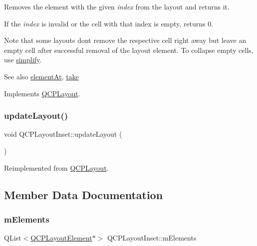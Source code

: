 Removes the element with the given {\itshape index} from the layout and returns it.

If the {\itshape index} is invalid or the cell with that index is empty, returns 0.

Note that some layouts don\textquotesingle{}t remove the respective cell right away but leave an empty cell after successful removal of the layout element. To collapse empty cells, use \mbox{\hyperlink{class_q_c_p_layout_inset_a18b7d508f0baa60cc5dcb1343cf7f32a}{simplify}}.

\begin{DoxySeeAlso}{See also}
\mbox{\hyperlink{class_q_c_p_layout_inset_a881ca205605bae9c034733b808f93a02}{element\+At}}, \mbox{\hyperlink{class_q_c_p_layout_inset_af7f13cc369f8190b5e7e17d5f39dfe1c}{take}} 
\end{DoxySeeAlso}


Implements \mbox{\hyperlink{class_q_c_p_layout_a5a79621fa0a6eabb8b520cfc04fb601a}{Q\+C\+P\+Layout}}.

\mbox{\label{class_q_c_p_layout_inset_a493526b922ea66a75c45ef1842446988}} 
\subsubsection{\texorpdfstring{updateLayout()}{updateLayout()}}
{\footnotesize\ttfamily void Q\+C\+P\+Layout\+Inset\+::update\+Layout (\begin{DoxyParamCaption}{ }\end{DoxyParamCaption})\hspace{0.3cm}{\ttfamily [virtual]}}



Reimplemented from \mbox{\hyperlink{class_q_c_p_layout_a165c77f6287ac92e8d03017ad913378b}{Q\+C\+P\+Layout}}.



\subsection{Member Data Documentation}
\mbox{\label{class_q_c_p_layout_inset_a8fff7eae9a1be9a5c1e544fb379f682f}} 
\subsubsection{\texorpdfstring{mElements}{mElements}}
{\footnotesize\ttfamily Q\+List$<$\mbox{\hyperlink{class_q_c_p_layout_element}{Q\+C\+P\+Layout\+Element}}$\ast$$>$ Q\+C\+P\+Layout\+Inset\+::m\+Elements\hspace{0.3cm}{\ttfamily [protected]}}

